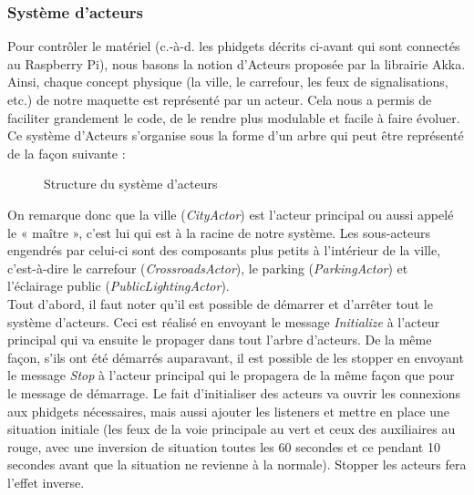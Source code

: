 \subsubsection{Système d'acteurs}\label{systeme-acteurs}
Pour contrôler le matériel (c.-à-d. les phidgets décrits ci-avant qui sont connectés au Raspberry Pi), nous basons la notion d’Acteurs proposée par la librairie Akka. Ainsi, chaque concept physique (la ville, le carrefour, les feux de signalisations, etc.) de notre maquette est représenté par un acteur. Cela nous a permis de faciliter grandement le code, de le rendre plus modulable et facile à faire évoluer.
Ce système d’Acteurs s’organise sous la forme d’un arbre qui peut être représenté de la façon suivante :
\begin{figure}[H]
    \begin{center}

        \caption{Structure du système d'acteurs}
    \end{center}
\end{figure}
On remarque donc que la ville (\emph{CityActor}) est l’acteur principal ou aussi appelé le « maître », c’est lui qui est à la racine de notre système. Les sous-acteurs engendrés par celui-ci sont des composants plus petits à l’intérieur de la ville, c’est-à-dire le carrefour (\emph{CrossroadsActor}), le parking (\emph{ParkingActor}) et l’éclairage public (\emph{PublicLightingActor}).\\

Tout d’abord, il faut noter qu’il est possible de démarrer et d’arrêter tout le système d’acteurs. Ceci est réalisé en envoyant le message \emph{Initialize} à l’acteur principal qui va ensuite le propager dans tout l’arbre d’acteurs. De la même façon, s'ils ont été démarrés auparavant, il est possible de les stopper en envoyant le message \emph{Stop} à l’acteur principal qui le propagera de la même façon que pour le message de démarrage. Le fait d’initialiser des acteurs va ouvrir les connexions aux phidgets nécessaires, mais aussi ajouter les listeners et mettre en place une situation initiale (les feux de la voie principale au vert et ceux des auxiliaires au rouge, avec une inversion de situation toutes les 60 secondes et ce pendant 10 secondes avant que la situation ne revienne à la normale). Stopper les acteurs fera l’effet inverse.\\

